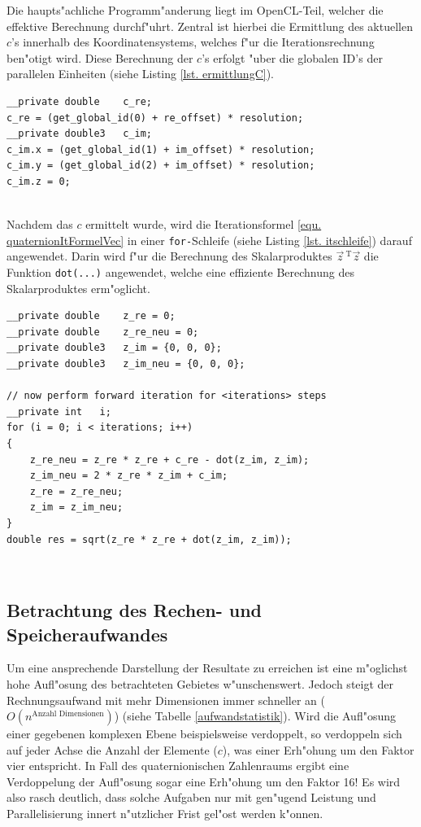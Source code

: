 \begin{refsection}
Die haupts"achliche Programm"anderung liegt im OpenCL-Teil, welcher die
effektive Berechnung durchf"uhrt. Zentral ist hierbei die Ermittlung
des aktuellen $c$'s innerhalb des Koordinatensystems, welches f"ur die
Iterationsrechnung ben"otigt wird. Diese Berechnung der $c$'s erfolgt
"uber die globalen ID's der parallelen Einheiten (siehe Listing
\ref{lst. ermittlungC}).
\lstset{style=OpenCL}
\begin{lstlisting}[caption={Ermittlung des Parameter $c$ f"ur die Iterationsrechnung}, label={lst. ermittlungC},captionpos=b]
__private double 	c_re;
c_re = (get_global_id(0) + re_offset) * resolution;
__private double3	c_im;
c_im.x = (get_global_id(1) + im_offset) * resolution;
c_im.y = (get_global_id(2) + im_offset) * resolution;
c_im.z = 0;
\end{lstlisting}$ $ \\[-0.8cm]
Nachdem das $c$ ermittelt wurde, wird die Iterationsformel
\ref{equ. quaternionItFormelVec} in einer {\tt for-}Schleife (siehe
Listing \ref{lst. itschleife}) darauf angewendet. Darin wird f"ur
die Berechnung des Skalarproduktes $\vec z\,^{\mathrm T}\vec z$ die
Funktion {\tt dot(...)} angewendet, welche eine effiziente Berechnung
des Skalarproduktes erm"oglicht.
\lstset{style=OpenCL}
\begin{lstlisting}[caption={Iterationsschleife}, label={lst. itschleife},captionpos=b]
__private double	z_re = 0;
__private double	z_re_neu = 0;
__private double3	z_im = {0, 0, 0};
__private double3	z_im_neu = {0, 0, 0};

// now perform forward iteration for <iterations> steps
__private int	i;
for (i = 0; i < iterations; i++)
{
    z_re_neu = z_re * z_re + c_re - dot(z_im, z_im);
    z_im_neu = 2 * z_re * z_im + c_im;
    z_re = z_re_neu;
    z_im = z_im_neu;
}
double res = sqrt(z_re * z_re + dot(z_im, z_im));
\end{lstlisting}$ $ \\[-1.5cm]

\subsection{Betrachtung des Rechen- und Speicheraufwandes}
Um eine ansprechende Darstellung der Resultate zu erreichen
ist eine m"oglichst hohe Aufl"osung des betrachteten Gebietes
w"unschenswert. Jedoch steigt der Rechnungsaufwand mit mehr Dimensionen
immer schneller an ($O(n^{\text{Anzahl Dimensionen}})$) (siehe Tabelle
\ref{aufwandstatistik}). Wird die Aufl"osung einer gegebenen komplexen
Ebene beispielsweise verdoppelt, so verdoppeln sich auf jeder Achse
die Anzahl der Elemente ($c$), was einer Erh"ohung um den Faktor
vier entspricht. In Fall des quaternionischen Zahlenraums ergibt eine
Verdoppelung der Aufl"osung sogar eine Erh"ohung um den Faktor 16! Es wird
also rasch deutlich, dass solche Aufgaben nur mit gen"ugend Leistung und
Parallelisierung innert n"utzlicher Frist gel"ost werden k"onnen.


\end{refsection}
